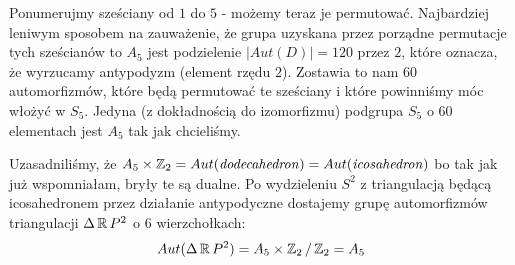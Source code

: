 Ponumerujmy sześciany od $1$ do $5$ - możemy teraz je permutować. Najbardziej leniwym sposobem na zauważenie, że grupa uzyskana przez porządne permutacje tych sześcianów to $A_5$ jest podzielenie $|Aut(D)|=120$ przez $2$, które oznacza, że wyrzucamy antypodyzm (element rzędu $2$). Zostawia to nam $60$ automorfizmów, które będą permutować te sześciany i które powinniśmy móc włożyć w $S_5$. Jedyna (z dokładnością do izomorfizmu) podgrupa $S_5$ o $60$ elementach jest $A_5$ tak jak chcieliśmy.

Uzasadniliśmy, że $A_5\times\operatorname{\mathbb{Z}}_2=Aut(\text{\emph{dodecahedron}})=Aut(\text{\emph{icosahedron}})$ bo tak jak już wspomniałam, bryły te są dualne. Po wydzieleniu $S^2$ z triangulacją będącą icosahedronem przez działanie antypodyczne dostajemy grupę automorfizmów triangulacji $\Delta \operatorname{\mathbb{R}} P^2$ o $6$ wierzchołkach: 
$$Aut(\Delta\operatorname{\mathbb{R}} P^2)=A_5\times\operatorname{\mathbb{Z}}_2/\operatorname{\mathbb{Z}}_2=A_5$$
